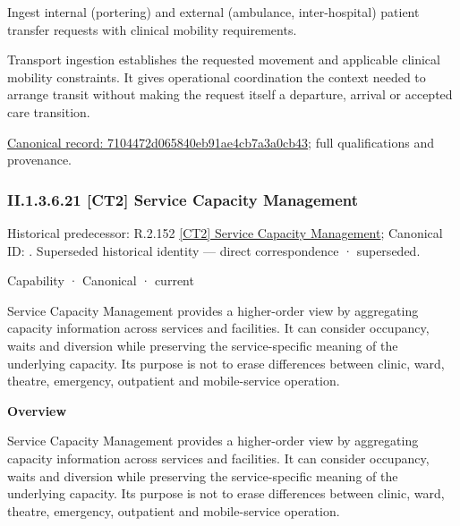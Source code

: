 Ingest internal (portering) and external (ambulance, inter-hospital) patient transfer requests with clinical mobility requirements.



Transport ingestion establishes the requested movement and applicable clinical mobility constraints. It gives operational coordination the context needed to arrange transit without making the request itself a departure, arrival or accepted care transition.


{\footnotesize \href{../../../../continuum/strategy/capability/feature/7104472d065840eb91ae4cb7a3a0cb43.md}{Canonical record: 7104472d065840eb91ae4cb7a3a0cb43}; full qualifications and provenance.}\par
\subsubsection*{II.1.3.6.21 [CT2] Service Capacity Management}
\label{navigation:II.1.3.6.21}

{\small Historical predecessor: R.2.152 \hyperref[element:ac205f374c9d41c3b6d18a6b7c356152]{[CT2] Service Capacity Management}; Canonical ID: \texttt{}. Superseded historical identity — direct correspondence · superseded.}\par
\label{element:d86105bf9c86445394088f65c895d37f}
{\small Capability · Canonical · current}\par

Service Capacity Management provides a higher-order view by aggregating capacity information across services and facilities. It can consider occupancy, waits and diversion while preserving the service-specific meaning of the underlying capacity. Its purpose is not to erase differences between clinic, ward, theatre, emergency, outpatient and mobile-service operation.



\textbf{Overview}



Service Capacity Management provides a higher-order view by aggregating capacity information across services and facilities. It can consider occupancy, waits and diversion while preserving the service-specific meaning of the underlying capacity. Its purpose is not to erase differences between clinic, ward, theatre, emergency, outpatient and mobile-service operation.



